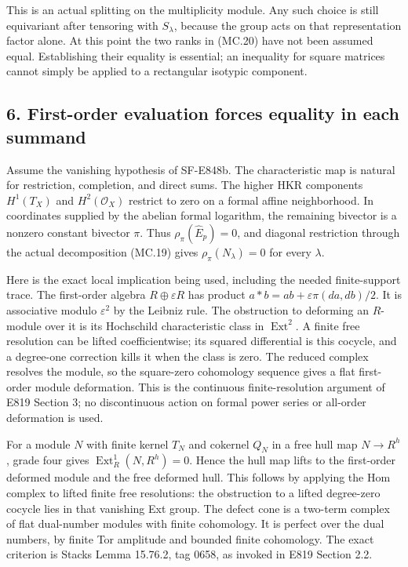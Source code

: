 This is an actual splitting on the multiplicity module. Any such
choice is still equivariant after tensoring with \(S_\lambda\),
because the group acts on that representation factor alone. At this
point the two ranks in (MC.20) have not been assumed equal. Establishing
their equality is essential; an inequality for square matrices cannot
simply be applied to a rectangular isotypic component.

\subsection{6. First-order evaluation forces equality in each summand}\label{SF-E848:s6}

Assume the vanishing hypothesis of SF-E848b. The characteristic map
is natural for restriction, completion, and direct sums. The higher
HKR components \(H^1(T_X)\) and \(H^2(\mathcal O_X)\) restrict to
zero on a formal affine neighborhood. In coordinates supplied by the
abelian formal logarithm, the remaining bivector is a nonzero constant
bivector \(\pi\). Thus \(\rho_\pi(\widehat E_p)=0\), and diagonal
restriction through the actual decomposition (MC.19) gives
\(\rho_\pi(N_\lambda)=0\) for every \(\lambda\).

Here is the exact local implication being used, including the needed
finite-support trace. The first-order algebra
\(R\oplus\varepsilon R\) has product
\(a*b=ab+\varepsilon\pi(da,db)/2\). It is associative modulo
\(\varepsilon^2\) by the Leibniz rule. The obstruction to deforming
an \(R\)-module over it is its Hochschild characteristic class in
\(\operatorname{Ext}^2\). A finite free resolution can be lifted
coefficientwise; its squared differential is this cocycle, and a
degree-one correction kills it when the class is zero. The reduced
complex resolves the module, so the square-zero cohomology sequence
gives a flat first-order module deformation. This is the continuous
finite-resolution argument of E819 Section 3; no discontinuous action
on formal power series or all-order deformation is used.

For a module \(N\) with finite kernel \(T_N\) and cokernel \(Q_N\)
in a free hull map \(N\to R^h\), grade four gives
\(\operatorname{Ext}^1_R(N,R^h)=0\). Hence the hull map lifts to the
first-order deformed module and the free deformed hull. This follows
by applying the Hom complex to lifted finite free resolutions: the
obstruction to a lifted degree-zero cocycle lies in that vanishing
Ext group. The defect cone is a two-term complex of flat dual-number
modules with finite cohomology. It is perfect over the dual numbers,
by finite Tor amplitude and bounded finite cohomology. The exact
criterion is Stacks Lemma 15.76.2, tag 0658,\cite{SF-StacksPerfect} as invoked in E819 Section 2.2.

